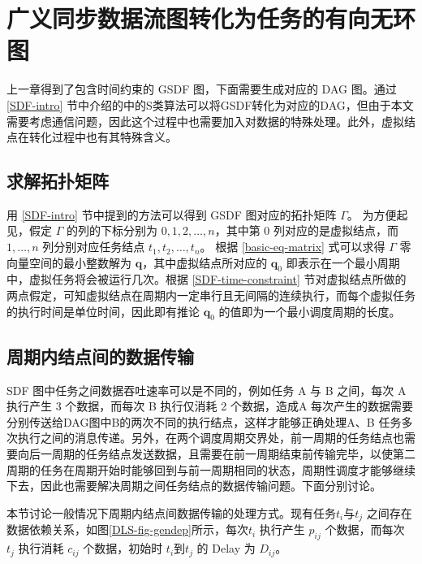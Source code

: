 

\chapter{广义同步数据流图转化为任务的有向无环图}
上一章得到了包含时间约束的 GSDF 图，下面需要生成对应的 DAG 图。通过 \ref{SDF-intro} 节中介绍的\cite{SDF1987}中的S类算法可以将GSDF转化为对应的DAG，但由于本文需要考虑通信问题，因此这个过程中也需要加入对数据的特殊处理。此外，虚拟结点在转化过程中也有其特殊含义。

\section{求解拓扑矩阵}

用 \ref{SDF-intro} 节中提到的方法可以得到 GSDF 图对应的拓扑矩阵 $\Gamma$。 为方便起见，假定 $\Gamma$ 的列的下标分别为 $0, 1, 2, \dots, n$，其中第 0 列对应的是虚拟结点，而 $1, \dots, n$ 列分别对应任务结点 $t_1, t_2, \dots, t_n$。 根据 \eqref{basic-eq-matrix} 式可以求得 $\Gamma$ 零向量空间的最小整数解为 $\textbf{q}$，其中虚拟结点所对应的 $\textbf{q}_0$ 即表示在一个最小周期中，虚拟任务将会被运行几次。根据 \ref{SDF-time-constraint} 节对虚拟结点所做的两点假定，可知虚拟结点在周期内一定串行且无间隔的连续执行，而每个虚拟任务的执行时间是单位时间，因此即有推论 $\textbf{q}_0$ 的值即为一个最小调度周期的长度。


\section{周期内结点间的数据传输}
\label{DAG-innerp}

SDF 图中任务之间数据吞吐速率可以是不同的，例如任务 A 与 B 之间，每次 A 执行产生 3 个数据，而每次 B 执行仅消耗 2 个数据，造成A 每次产生的数据需要分别传送给DAG图中B的两次不同的执行结点，这样才能够正确处理A、B 任务多次执行之间的消息传递。另外，在两个调度周期交界处，前一周期的任务结点也需要向后一周期的任务结点发送数据，且需要在前一周期结束前传输完毕，以使第二周期的任务在周期开始时能够回到与前一周期相同的状态，周期性调度才能够继续下去，因此也需要解决周期之间任务结点的数据传输问题。下面分别讨论。


本节讨论一般情况下周期内结点间数据传输的处理方式。现有任务$t_i$与$t_j$ 之间存在数据依赖关系，如图\ref{DLS-fig-gendep}所示，每次$t_i$ 执行产生 $p_{ij}$ 个数据，而每次 $t_j$ 执行消耗 $c_{ij}$ 个数据，初始时 $t_i$到$t_j$ 的 Delay 为 $D_{ij}$。

